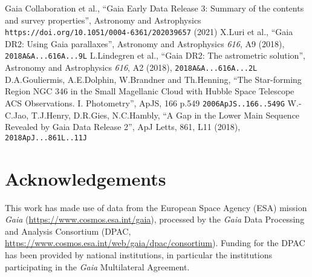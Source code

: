 \documentclass{article}
\begin{document}
\begin{thebibliography}{9}
   Gaia Collaboration et al.,
   ``Gaia Early Data Release 3: Summary of the contents and survey properties'',
   Astronomy and Astrophysics
   {\tt https://doi.org/10.1051/0004-6361/202039657} (2021)
   X.Luri et al.,
   ``Gaia DR2: Using Gaia parallaxes'',
   Astronomy and Astrophysics {\em 616}, A9 (2018),
   {\tt 2018A\&A...616A...9L}
   L.Lindegren et al.,
   ``Gaia DR2: The astrometric solution'',
   Astronomy and Astrophysics {\em 616}, A2 (2018),
   {\tt 2018A\&A...616A...2L}
   D.A.Gouliermis, A.E.Dolphin, W.Brandner and Th.Henning,
   ``The Star-forming Region NGC 346 in the Small Magellanic
     Cloud with Hubble Space Telescope ACS Observations. I. Photometry'',
   ApJS, 166 p.549
   {\tt 2006ApJS..166..549G}
   W.-C.Jao, T.J.Henry, D.R.Gies, N.C.Hambly,
   ``A Gap in the Lower Main Sequence Revealed by Gaia Data Release 2'',
   ApJ Letts, 861, L11 (2018),
   {\tt 2018ApJ...861L..11J}
\end{thebibliography}

\section*{Acknowledgements}

This work has made use of data from the European Space Agency (ESA) mission
{\it Gaia} (\url{https://www.cosmos.esa.int/gaia}), processed by the {\it Gaia}
Data Processing and Analysis Consortium
(DPAC, \url{https://www.cosmos.esa.int/web/gaia/dpac/consortium}).
Funding for the DPAC
has been provided by national institutions, in particular the institutions
participating in the {\it Gaia} Multilateral Agreement.


\label{lastPage}
\end{document}
